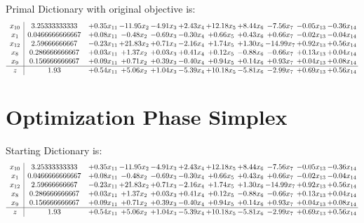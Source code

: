 \documentclass[9pt]{article}
\begin{document}
Primal Dictionary with original objective is:
\[\begin{array}{c| c c@{\hskip 2pt} c@{\hskip 2pt} c@{\hskip 2pt} c@{\hskip 2pt} c@{\hskip 2pt} c@{\hskip 2pt} c@{\hskip 2pt} c@{\hskip 2pt} c@{\hskip 2pt} }
 x_{10}   &  3.25333333333 & +  0.35 x_{11} & -11.95 x_{2} & -4.91 x_{3} & +  2.43 x_{4} & + 12.18 x_{5} & +  8.44 x_{6} & -7.56 x_{7} & -0.05 x_{13} & -0.36 x_{14}\\
 x_{1}   &  0.0466666666667 & +  0.08 x_{11} & -0.48 x_{2} & -0.69 x_{3} & -0.30 x_{4} & +  0.66 x_{5} & +  0.43 x_{6} & +  0.66 x_{7} & -0.02 x_{13} & -0.04 x_{14}\\
 x_{12}   &  2.59666666667 & -0.23 x_{11} & + 21.83 x_{2} & +  0.71 x_{3} & -2.16 x_{4} & +  1.74 x_{5} & +  1.30 x_{6} & -14.99 x_{7} & +  0.92 x_{13} & +  0.56 x_{14}\\
 x_{8}   &  0.286666666667 & +  0.03 x_{11} & +  1.37 x_{2} & +  0.03 x_{3} & +  0.41 x_{4} & +  0.12 x_{5} & -0.88 x_{6} & -0.66 x_{7} & +  0.13 x_{13} & +  0.04 x_{14}\\
 x_{9}   &  0.156666666667 & +  0.09 x_{11} & +  0.71 x_{2} & +  0.39 x_{3} & -0.40 x_{4} & +  0.94 x_{5} & +  0.14 x_{6} & +  0.93 x_{7} & +  0.04 x_{13} & +  0.08 x_{14}\\
\hline
z    &  1.93 & +  0.54 x_{11} & +  5.06 x_{2} & +  1.04 x_{3} & -5.39 x_{4} & + 10.18 x_{5} & -5.81 x_{6} & -2.99 x_{7} & +  0.69 x_{13} & +  0.56 x_{14}\\
\end{array}\]
\section{Optimization Phase Simplex}
Starting Dictionary is:
\[\begin{array}{c| c c@{\hskip 2pt} c@{\hskip 2pt} c@{\hskip 2pt} c@{\hskip 2pt} c@{\hskip 2pt} c@{\hskip 2pt} c@{\hskip 2pt} c@{\hskip 2pt} c@{\hskip 2pt} }
 x_{10}   &  3.25333333333 & +  0.35 x_{11} & -11.95 x_{2} & -4.91 x_{3} & +  2.43 x_{4} & + 12.18 x_{5} & +  8.44 x_{6} & -7.56 x_{7} & -0.05 x_{13} & -0.36 x_{14}\\
 x_{1}   &  0.0466666666667 & +  0.08 x_{11} & -0.48 x_{2} & -0.69 x_{3} & -0.30 x_{4} & +  0.66 x_{5} & +  0.43 x_{6} & +  0.66 x_{7} & -0.02 x_{13} & -0.04 x_{14}\\
 x_{12}   &  2.59666666667 & -0.23 x_{11} & + 21.83 x_{2} & +  0.71 x_{3} & -2.16 x_{4} & +  1.74 x_{5} & +  1.30 x_{6} & -14.99 x_{7} & +  0.92 x_{13} & +  0.56 x_{14}\\
 x_{8}   &  0.286666666667 & +  0.03 x_{11} & +  1.37 x_{2} & +  0.03 x_{3} & +  0.41 x_{4} & +  0.12 x_{5} & -0.88 x_{6} & -0.66 x_{7} & +  0.13 x_{13} & +  0.04 x_{14}\\
 x_{9}   &  0.156666666667 & +  0.09 x_{11} & +  0.71 x_{2} & +  0.39 x_{3} & -0.40 x_{4} & +  0.94 x_{5} & +  0.14 x_{6} & +  0.93 x_{7} & +  0.04 x_{13} & +  0.08 x_{14}\\
\hline
z    &  1.93 & +  0.54 x_{11} & +  5.06 x_{2} & +  1.04 x_{3} & -5.39 x_{4} & + 10.18 x_{5} & -5.81 x_{6} & -2.99 x_{7} & +  0.69 x_{13} & +  0.56 x_{14}\\
\end{array}\]
\end{document}
